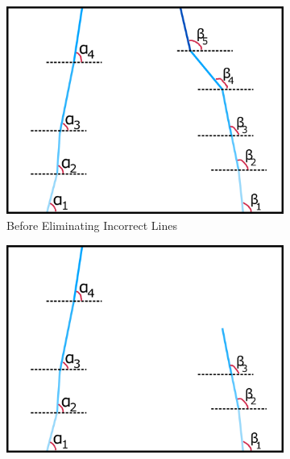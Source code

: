 \documentclass[a4paper,12pt]{article}
\begin{document}
\begin{enumerate}[A.]
\begin{figure}[t!]
\centering

\begin{subfigure}{.46\textwidth}

\centering

\includegraphics[width=0.44\unitlength]{images/dataP_explained3}

\caption{\label{fig:dataP_explained3} Before Eliminating Incorrect Lines}

\end{subfigure}%
\begin{subfigure}{.46\textwidth}

\centering

\includegraphics[width=0.44\unitlength]{images/dataP_explained4}


\end{subfigure}
\end{figure}
\end{enumerate}
\end{document}
